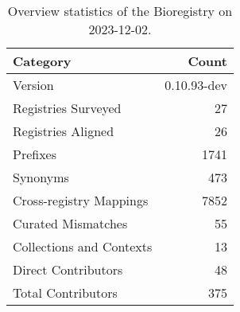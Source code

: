 \begin{table}
\caption{Overview statistics of the Bioregistry on 2023-12-02.}
\label{tab:bioregistry-summary}
\begin{tabular}{lr}
\toprule
Category & Count \\
\midrule
Version & 0.10.93-dev \\
Registries Surveyed & 27 \\
Registries Aligned & 26 \\
Prefixes & 1741 \\
Synonyms & 473 \\
Cross-registry Mappings & 7852 \\
Curated Mismatches & 55 \\
Collections and Contexts & 13 \\
Direct Contributors & 48 \\
Total Contributors & 375 \\
\bottomrule
\end{tabular}
\end{table}
